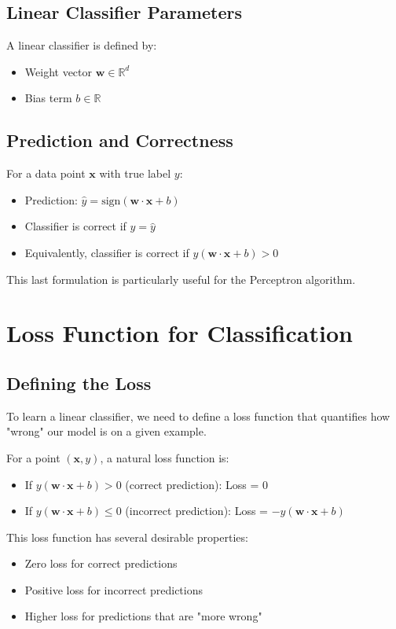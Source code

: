 \documentclass{article}
\begin{document}
\subsection{Linear Classifier Parameters}
A linear classifier is defined by:
\begin{itemize}
    \item Weight vector $\mathbf{w} \in \mathbb{R}^d$
    \item Bias term $b \in \mathbb{R}$
\end{itemize}

\subsection{Prediction and Correctness}
For a data point $\mathbf{x}$ with true label $y$:
\begin{itemize}
    \item Prediction: $\hat{y} = \text{sign}(\mathbf{w} \cdot \mathbf{x} + b)$
    \item Classifier is correct if $y = \hat{y}$
    \item Equivalently, classifier is correct if $y(\mathbf{w} \cdot \mathbf{x} + b) > 0$
\end{itemize}

This last formulation is particularly useful for the Perceptron algorithm.

\section{Loss Function for Classification}

\subsection{Defining the Loss}
To learn a linear classifier, we need to define a loss function that quantifies how "wrong" our model is on a given example.

For a point $(\mathbf{x}, y)$, a natural loss function is:
\begin{itemize}
    \item If $y(\mathbf{w} \cdot \mathbf{x} + b) > 0$ (correct prediction): Loss = 0
    \item If $y(\mathbf{w} \cdot \mathbf{x} + b) \leq 0$ (incorrect prediction): Loss = $-y(\mathbf{w} \cdot \mathbf{x} + b)$
\end{itemize}

This loss function has several desirable properties:
\begin{itemize}
    \item Zero loss for correct predictions
    \item Positive loss for incorrect predictions
    \item Higher loss for predictions that are "more wrong"
\end{itemize}
\end{document}
